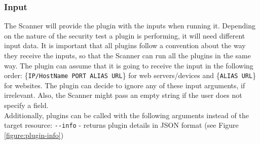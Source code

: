 \subsubsection{Input}
The Scanner will provide the plugin with the inputs when running it. Depending on the nature of the security test a plugin is performing, it will need different input data. It is important that all plugins follow a convention about the way they receive the inputs, so that the Scanner can run all the plugins in the same way. The plugin can assume that it is going to receive the input in the following order: \{\texttt{IP/HostName PORT ALIAS URL}\} for web servers/devices and \{\texttt{ALIAS URL}\} for websites. The plugin can decide to ignore any of these input arguments, if irrelevant. Also, the Scanner might pass an empty string if the user does not specify a field.
\\
Additionally, plugins can be called with the following arguments instead of the target resource:
\texttt{-{}-info} - returns plugin details in JSON format (see Figure \ref{figure:plugin-info})  
